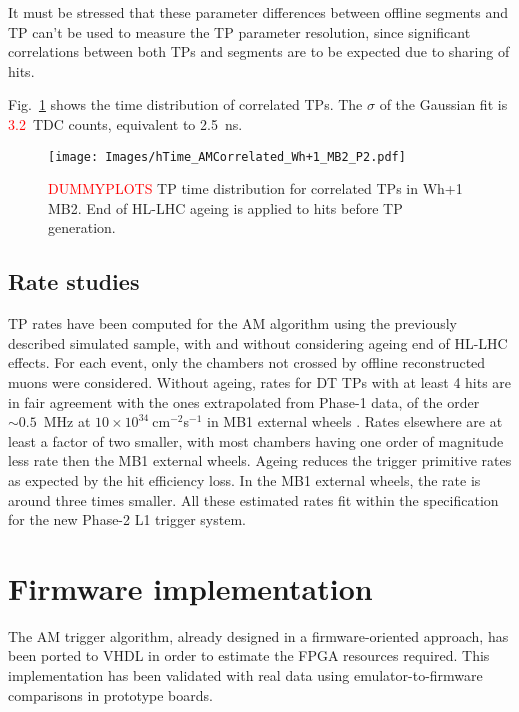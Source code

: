 \documentclass[../main.tex]{subfiles}
\begin{document}
It must be stressed that these parameter differences between offline segments and TP can't be used to measure the TP parameter resolution, since significant correlations between both TPs and segments are to be expected due to sharing of hits.


Fig.~\ref{dts:fig:time} shows the time distribution of correlated TPs. The $\sigma$ of the Gaussian fit is \textcolor{red}{3.2}~TDC counts, equivalent to 2.5~ns.

\begin{figure}[h!]
\begin{center}
\texttt{[image: Images/hTime\_AMCorrelated\_Wh+1\_MB2\_P2.pdf]}
\end{center}
\caption{\textcolor{red}{DUMMYPLOTS} TP time distribution for correlated TPs in Wh+1 MB2. End of HL-LHC ageing is applied to hits before TP generation.}
\label{dts:fig:time}
\end{figure}


\subsection{Rate studies}

TP rates have been computed for the AM algorithm using the previously described simulated sample, with and without considering ageing end of HL-LHC effects. For each event, only the chambers not crossed by offline reconstructed muons were considered. Without ageing, rates for DT TPs with at least 4 hits are in fair agreement with the ones extrapolated from Phase-1 data, of the order $\sim0.5$~MHz at $10\times10^{34}~$cm${}^{-2}$s${}^{-1}$ in MB1 external wheels \cite{muontdr}. Rates elsewhere are at least a factor of two smaller, with most chambers having one order of magnitude less rate then the MB1 external wheels. Ageing reduces the trigger primitive rates as expected by the hit efficiency loss. In the MB1 external wheels, the rate is around three times smaller. All these estimated rates fit within the specification for the new Phase-2 L1 trigger system.


\section{Firmware implementation}

The AM trigger algorithm, already designed in a firmware-oriented approach, has been ported to VHDL in order to estimate the FPGA resources required. This implementation has been validated with real data using emulator-to-firmware comparisons in prototype boards.
\end{document}
